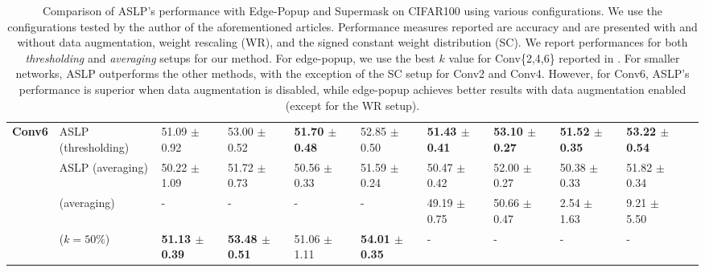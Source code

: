 \begin{table}[htbp]
{\begin{tabular}{lllllllllll}
      \multirow{4}{*}{\textbf{Conv6}} & ASLP (thresholding) & 51.09 $\pm$ 0.92 & 53.00 $\pm$ 0.52 & \textbf{51.70 $\pm$ 0.48} & 52.85 $\pm$ 0.50 & \textbf{51.43 $\pm$ 0.41} & \textbf{53.10 $\pm$ 0.27} & \textbf{51.52 $\pm$ 0.35} & \textbf{53.22 $\pm$ 0.54} \\
      & ASLP (averaging) & 50.22 $\pm$ 1.09 & 51.72 $\pm$ 0.73 & 50.56 $\pm$ 0.33 & 51.59 $\pm$ 0.24 & 50.47 $\pm$ 0.42 & 52.00 $\pm$ 0.27 & 50.38 $\pm$ 0.33 & 51.82 $\pm$ 0.34 \\
      & \cite{DBLP:conf/nips/ZhouLLY19} (averaging) & - & - & - & - & 49.19 $\pm$ 0.75 & 50.66 $\pm$ 0.47 & 2.54 $\pm$ 1.63 & 9.21 $\pm$ 5.50 \\
      & \cite{DBLP:conf/cvpr/RamanujanWKFR20} ($k=50\%$) & \textbf{51.13 $\pm$ 0.39} & \textbf{53.48 $\pm$ 0.51} & 51.06 $\pm$ 1.11 & \textbf{54.01 $\pm$ 0.35} & - & - & - & - \\
      \bottomrule
    \end{tabular}
  } \caption{Comparison of ASLP's performance with Edge-Popup and Supermask
  \cite{DBLP:conf/cvpr/RamanujanWKFR20,DBLP:conf/nips/ZhouLLY19} on CIFAR100
  using various configurations. We use the configurations tested by the author
  of the aforementioned articles. Performance measures reported are accuracy and
  are presented with and without data augmentation, weight rescaling (WR), and
  the signed constant weight distribution (SC). We report performances for both
  \textit{thresholding} and \textit{averaging} setups for our method. For edge-popup, we use
  the best $k$ value for Conv\{2,4,6\} reported in
  \cite{DBLP:conf/cvpr/RamanujanWKFR20}. For smaller networks, ASLP outperforms
  the other methods, with the exception of the SC setup for Conv2 and Conv4.
  However, for Conv6, ASLP's performance is superior when data augmentation is
  disabled, while edge-popup achieves better results with data augmentation
  enabled (except for the WR setup).}
  \label{tab:chap2:con_performances_comparison_cifar100}
\end{table}


